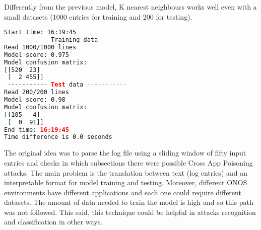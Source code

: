 \documentclass[a4paper,10pt]{memoir}
\begin{document}
Differently from the previous model, K nearest neighbours works well even with a small datasets (1000 entries for training and 200 for testing).
\begin{lstlisting}[language=bash]
Start time: 16:19:45
 ----------- Training data -----------
Read 1000/1000 lines
Model score: 0.975
Model confusion matrix: 
[[520  23]
 [  2 455]]
 ----------- Test data -----------
Read 200/200 lines
Model score: 0.98
Model confusion matrix: 
[[105   4]
 [  0  91]]
End time: 16:19:45
Time difference is 0.0 seconds
\end{lstlisting}

The original idea was to parse the log file using a sliding window of fifty input entries and checks in which subsections there were possible Cross App Poisoning attacks. The main problem is the translation between text (log entries) and an interpretable format for model training and testing. Moreover, different ONOS environments have different applications and each one could require different datasets. The amount of data needed to train the model is high and so this path was not followed. This said, this technique could be helpful in attacks recognition and classification in other ways.


\clearpage
\end{document}
